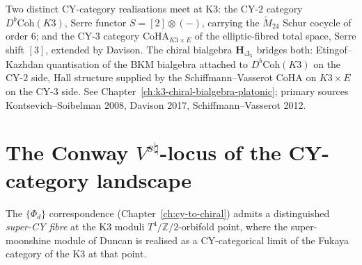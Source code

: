 \begin{remark}
\label{rem:cycat-K3-two-sides}
Two distinct CY-category realisations meet at K3: the CY-$2$ category
$D^b\mathrm{Coh}(K3)$, Serre functor $S = [2]\otimes(-)$, carrying the
$\widetilde M_{24}$ Schur cocycle of order $6$; and the CY-$3$ category
$\mathrm{CoHA}_{K3\times E}$ of the elliptic-fibred total space, Serre
shift $[3]$, extended by Davison. The chiral bialgebra
$\mathbf H_{\Delta_5}$ bridges both: Etingof--Kazhdan quantisation of
the BKM bialgebra attached to $D^b\mathrm{Coh}(K3)$ on the CY-$2$ side,
Hall structure supplied by the Schiffmann--Vasserot CoHA on $K3\times E$
on the CY-$3$ side. See Chapter~\ref{ch:k3-chiral-bialgebra-platonic};
primary sources Kontsevich--Soibelman 2008, Davison 2017,
Schiffmann--Vasserot 2012.
\end{remark}

\section{The Conway \texorpdfstring{$V^{s\natural}$}{V-snatural}-locus of the CY-category landscape}
\label{sec:cycat-witten-conway}

The $\{\Phi_d\}$ correspondence (Chapter~\textup{\ref{ch:cy-to-chiral}})
admits a distinguished \emph{super-CY fibre} at the K3 moduli
$T^4/\mathbb{Z}/2$-orbifold point, where the super-moonshine
module of Duncan is realised as a CY-categorical limit of
the Fukaya category of the K3 at that point.

